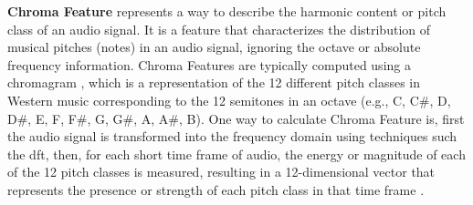 




\textbf{Chroma Feature} represents a way to describe the harmonic content or pitch class of an audio signal. It is a feature that characterizes the distribution of musical pitches (notes) in an audio signal, ignoring the octave or absolute frequency information. Chroma Features are typically computed using a chromagram %
, which is a representation of the 12 different pitch classes in Western music corresponding to the 12 semitones in an octave (e.g., C, C\#, D, D\#, E, F, F\#, G, G\#, A, A\#, B). One way to calculate Chroma Feature is, first the audio signal is transformed into the frequency domain using techniques such the \gls{dft}, then, for each short time frame of audio, the energy or magnitude of each of the 12 pitch classes is measured, resulting in a 12-dimensional vector that represents the presence or strength of each pitch class in that time frame \cite{Bartsch2005}.



